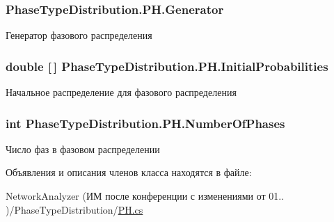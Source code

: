 \subsubsection[{\texorpdfstring{Generator}{Generator}}]{ Phase\+Type\+Distribution.\+P\+H.\+Generator\hspace{0.3cm}{\ttfamily [get]}}\hypertarget{class_phase_type_distribution_1_1_p_h_a80552346d502e6805f79ea0262fb209f}{}\label{class_phase_type_distribution_1_1_p_h_a80552346d502e6805f79ea0262fb209f}


Генератор фазового распределения 

\subsubsection[{\texorpdfstring{Initial\+Probabilities}{InitialProbabilities}}]{\setlength{\rightskip}{0pt plus 5cm}double \mbox{[}$\,$\mbox{]} Phase\+Type\+Distribution.\+P\+H.\+Initial\+Probabilities\hspace{0.3cm}{\ttfamily [get]}}\hypertarget{class_phase_type_distribution_1_1_p_h_a987a901d55fcc253f34c42218dbb4456}{}\label{class_phase_type_distribution_1_1_p_h_a987a901d55fcc253f34c42218dbb4456}


Начальное распределение для фазового распределения 

\subsubsection[{\texorpdfstring{Number\+Of\+Phases}{NumberOfPhases}}]{\setlength{\rightskip}{0pt plus 5cm}int Phase\+Type\+Distribution.\+P\+H.\+Number\+Of\+Phases\hspace{0.3cm}{\ttfamily [get]}}\hypertarget{class_phase_type_distribution_1_1_p_h_a1cc9a81b38dd0c3f8dfa26a789262fec}{}\label{class_phase_type_distribution_1_1_p_h_a1cc9a81b38dd0c3f8dfa26a789262fec}


Число фаз в фазовом распределении 



Объявления и описания членов класса находятся в файле\+:\begin{DoxyCompactItemize}
\item 
Network\+Analyzer (ИМ после конференции  с изменениями от 01.. )/\+Phase\+Type\+Distribution/\hyperlink{_p_h_8cs}{P\+H.\+cs}\end{DoxyCompactItemize}
